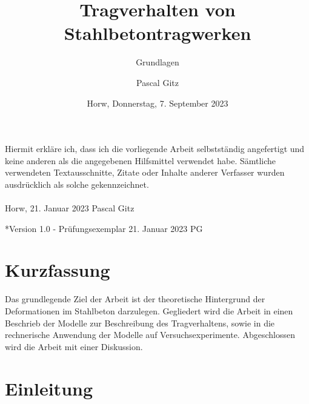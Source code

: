 \documentclass[
  letterpaper,
]{scrreprt}
\title{Tragverhalten von Stahlbetontragwerken}
\subtitle
{Grundlagen}
\date{\large Horw, Donnerstag, 7. September 2023}
\author{Pascal Gitz}
\renewcommand*\contentsname{Inhaltsverzeichnis}
\newcommand\contentsname{Inhaltsverzeichnis}
\begin{document}
\maketitle

Hiermit erkläre ich, dass ich die vorliegende Arbeit selbstständig angefertigt und keine anderen als die angegebenen Hilfsmittel verwendet habe. Sämtliche verwendeten Textausschnitte, Zitate oder Inhalte anderer Verfasser wurden ausdrücklich als solche gekennzeichnet.\\%
%
\\%
%
Horw, 21. Januar 2023 \hfill Pascal Gitz%

\vfill

*Version 1.0 - Prüfungsexemplar \hfill 21. Januar 2023 \quad \quad \quad \quad \quad PG\\

\newpage

\chapter*{Kurzfassung}

Das grundlegende Ziel der Arbeit ist der theoretische Hintergrund der Deformationen im Stahlbeton darzulegen. Gegliedert wird die Arbeit in einen Beschrieb der Modelle zur Beschreibung des Tragverhaltens, sowie in die rechnerische Anwendung der Modelle auf Versuchsexperimente. Abgeschlossen wird die Arbeit mit einer Diskussion.

\ifdefined\Shaded\renewenvironment{Shaded}{\begin{tcolorbox}[breakable, boxrule=0pt, frame hidden, enhanced, sharp corners, interior hidden, borderline west={3pt}{0pt}{shadecolor}]}{\end{tcolorbox}}\fi

\renewcommand*\contentsname{Inhaltsverzeichnis}
{
\hypersetup{linkcolor=}
\setcounter{tocdepth}{1}
\tableofcontents
}

\hypertarget{einleitung}{%
\chapter{Einleitung}\label{einleitung}}
\end{document}
